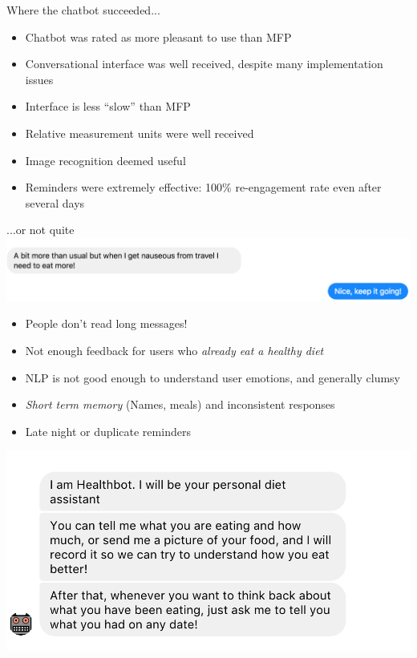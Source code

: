 \documentclass[landscape]{infslides}
\begin{document}
\begin{slide}{Where the chatbot succeeded...}
    \begin{itemize}
        \item Chatbot was rated as more pleasant to use than MFP
        \item Conversational interface was well received, despite many implementation issues
        \item Interface is less ``slow'' than MFP
        \item Relative measurement units were well received
        \item Image recognition deemed useful
        \item Reminders were extremely effective: 100\% re-engagement rate even after several days
    \end{itemize}
\end{slide}
\begin{slide}{...or not quite}
    \includegraphics[scale=0.75]{Nauseous.png}
    \begin{multicols}{2}
    \begin{itemize}\shrinklist
        \item People don't read long messages!  
        \item Not enough feedback for users who \textit{already eat a healthy diet}
        \item NLP is not good enough to understand user emotions, and generally clumsy
        \item \textit{Short term memory} (Names, meals) and inconsistent responses
        \item Late night or duplicate reminders
    \end{itemize}
    \includegraphics{Introduction.png}
    \end{multicols}
\end{slide}
\end{document}
